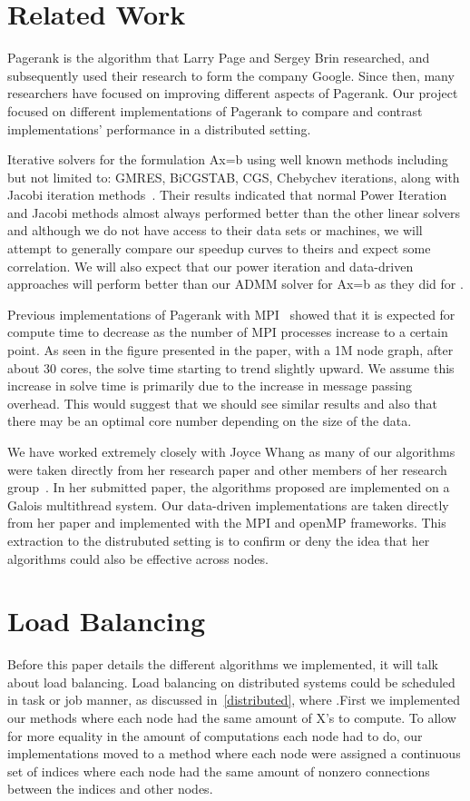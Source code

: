 \documentclass[letterpaper,12pt,onecolumn]{article}
\begin{document}
\section{Related Work}

Pagerank is the algorithm that Larry Page and Sergey Brin researched, and subsequently used their research to form the company Google. Since then, many researchers have focused on improving different aspects of Pagerank. Our project focused on different implementations of Pagerank to compare and contrast implementations' performance in a distributed setting. 

Iterative solvers for the formulation Ax=b using well known methods including but not limited to: GMRES, BiCGSTAB, CGS, Chebychev iterations, along with Jacobi iteration methods~\cite{Fast Parallel}. Their results indicated that normal Power Iteration and Jacobi methods almost always performed better than the other linear solvers and although we do not have access to their data sets or machines, we will attempt to generally compare our speedup curves to theirs and expect some correlation. We will also expect that our power iteration and data-driven approaches will perform better than our ADMM solver for Ax=b as they did for \cite{Fast Parallel}.
 
Previous implementations of Pagerank with MPI~\cite{MPIPR} showed that it is expected for compute time to decrease as the number of MPI processes increase to a certain point. As seen in the figure presented in the paper, with a 1M node graph, after about 30 cores, the solve time starting to trend slightly upward. We assume this increase in solve time is primarily due to the increase in message passing overhead. This would suggest that we should see similar results and also that there may be an optimal core number depending on the size of the data. 

We have worked extremely closely with Joyce Whang as many of our algorithms were taken directly from her research paper and other members of her research group~\cite{Joyce}. In her submitted paper, the algorithms proposed are implemented on a Galois multithread system. Our data-driven implementations are taken directly from her paper and implemented with the MPI and openMP frameworks. This extraction to the distrubuted setting is to confirm or deny the idea that her algorithms could also be effective across nodes.

\section{Load Balancing}
Before this paper details the different algorithms we implemented, it will talk about load balancing. Load balancing on distributed systems could be scheduled in task or job manner, as discussed in~\ref{distributed}, where .First we implemented our methods where each node had the same amount of X's to compute. To allow for more equality in the amount of computations each node had to do, our implementations moved to a method where each node were assigned a continuous set of indices where each node had the same amount of nonzero connections between the indices and other nodes. 
\end{document}
